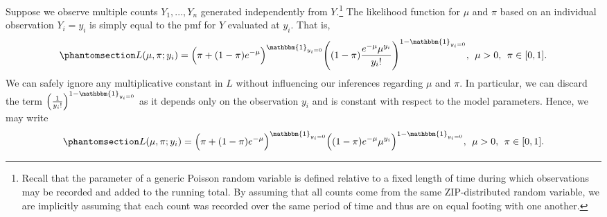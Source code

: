 \documentclass[
  12pt]{article}
\begin{document}
Suppose we observe multiple counts \(Y_1, ..., Y_n\) generated
independently from \(Y\).\footnote{Recall that the parameter of a
  generic Poisson random variable is defined relative to a fixed length
  of time during which observations may be recorded and added to the
  running total. By assuming that all counts come from the same
  ZIP-distributed random variable, we are implicitly assuming that each
  count was recorded over the same period of time and thus are on equal
  footing with one another.} The likelihood function for \(\mu\) and
\(\pi\) based on an individual observation \(Y_i = y_i\) is simply equal
to the pmf for \(Y\) evaluated at \(y_i\). That is,
\begin{equation}\phantomsection\label{eq-4-1-5}{
L(\mu, \pi; y_i) = \Big(\pi + (1 - \pi)e^{-\mu}\Big)^{\mathbbm{1}_{y_i = 0}}\Bigg(   (1-\pi)\frac{e^{-\mu}\mu^{y_i}}{y_i!}\Bigg)^{1 - {\mathbbm{1}_{y_i = 0}}}, \> \> \mu > 0, \> \> \pi \in [0, 1].
}\end{equation} We can safely ignore any multiplicative constant in
\(L\) without influencing our inferences regarding \(\mu\) and \(\pi\).
In particular, we can discard the term
\(\Big(\frac{1}{y_i!}\Big)^{1 - {\mathbbm{1}_{y_i = 0}}}\) as it depends
only on the observation \(y_i\) and is constant with respect to the
model parameters. Hence, we may write
\begin{equation}\phantomsection\label{eq-4-1-6}{
L(\mu, \pi; y_i) = \Big(\pi + (1 - \pi)e^{-\mu}\Big)^{\mathbbm{1}_{y_i = 0}}\Big(   (1-\pi)e^{-\mu}\mu^{y_i}\Big)^{1 - {\mathbbm{1}_{y_i = 0}}}, \> \> \mu > 0, \> \> \pi \in [0, 1].
}\end{equation}
\end{document}
